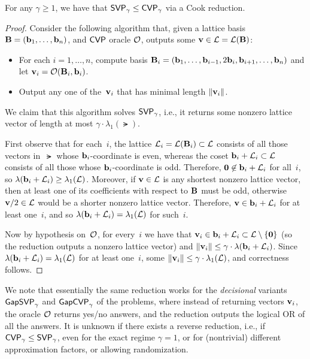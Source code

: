 \documentclass[11pt]{article}
\begin{document}
\begin{theorem}
  For any $\gamma \geq 1$, we have that $\mathsf{SVP}_{\gamma} \leq \mathsf{CVP}_{\gamma}$ via a Cook reduction.
\end{theorem}

\begin{proof}
  Consider the following algorithm that, given a lattice basis $\mathbf{B}=(\mathbf{b}_1, \ldots, \mathbf{b}_n)$, and $\mathsf{CVP}$ oracle $\mathcal{O}$, outputs some $\mathbf{v} \in \mathcal{L} = \mathcal{L}(\mathbf{B})$:
  \begin{itemize}[itemsep=0pt]
  \item For each $i=1,\ldots, n$, compute basis
    $\mathbf{B}_i = (\mathbf{b}_1, \ldots, \mathbf{b}_{i-1}, 2\mathbf{b}_i, \mathbf{b}_{i+1},
    \ldots, \mathbf{b}_n )$ and let $\mathbf{v}_i = \mathcal{O}(\mathbf{B}_i, \mathbf{b}_i)$.
  \item Output any one of the~$\mathbf{v}_i$ that has minimal length $\lVert\mathbf{v}_{i}\rVert$.
  \end{itemize}
  We claim that this algorithm solves $\mathsf{SVP}_{\gamma}$, i.e., it returns some nonzero lattice vector of length at most $\gamma \cdot \lambda_{1}(\lat)$.

  First observe that for each~$i$, the lattice $\mathcal{L}_{i} = \mathcal{L}(\mathbf{B}_{i}) \subset \mathcal{L}$ consists of all those vectors in~$\lat$ whose $\mathbf{b}_{i}$-coordinate is even, whereas the coset $\mathbf{b}_{i} + \mathcal{L}_{i} \subset \mathcal{L}$ consists of all those whose $\mathbf{b}_{i}$-coordinate is odd.
  Therefore, $\mathbf{0} \not\in \mathbf{b}_{i} + \mathcal{L}_{i}$ for all~$i$, so $\lambda(\mathbf{b}_{i} + \mathcal{L}_{i}) \geq \lambda_{1}(\mathcal{L})$.
  Moreover, if $\mathbf{v} \in \mathcal{L}$ is any shortest nonzero lattice vector, then at least one of its coefficients with respect to $\mathbf{B}$ must be odd, otherwise $\mathbf{v}/2 \in \mathcal{L}$ would be a shorter nonzero lattice vector.
  Therefore, $\mathbf{v} \in \mathbf{b}_{i} + \mathcal{L}_{i}$ for at least one~$i$, and so $\lambda(\mathbf{b}_{i}+\mathcal{L}_{i}) = \lambda_{1}(\mathcal{L})$ for such~$i$.

  Now by hypothesis on~$\mathcal{O}$, for every~$i$ we have that $\mathbf{v}_{i} \in \mathbf{b}_{i} + \mathcal{L}_{i} \subset \mathcal{L} \setminus \{\mathbf{0}\}$ (so the reduction outputs a nonzero lattice vector) and $\lVert\mathbf{v}_{i}\rVert \leq \gamma \cdot \lambda(\mathbf{b}_{i} + \mathcal{L}_{i})$.
  Since $\lambda(\mathbf{b}_{i} + \mathcal{L}_{i}) = \lambda_{1}(\mathcal{L})$ for at least one~$i$, some $\lVert\mathbf{v}_{i}\rVert \leq \gamma \cdot \lambda_{1}(\mathcal{L})$, and correctness follows.
\end{proof}

We note that essentially the same reduction works for the \emph{decisional} variants $\mathsf{GapSVP}_{\gamma}$ and $\mathsf{GapCVP}_{\gamma}$ of the problems, where instead of returning vectors $\mathbf{v}_{i}$, the oracle $\mathcal{O}$ returns yes/no answers, and the reduction outputs the logical OR of all the answers.
It is unknown if there exists a reverse reduction, i.e., if $\mathsf{CVP}_{\gamma} \leq \mathsf{SVP}_{\gamma}$, even for the exact regime $\gamma=1$, or for (nontrivial) different approximation factors, or allowing randomization.
\end{document}
